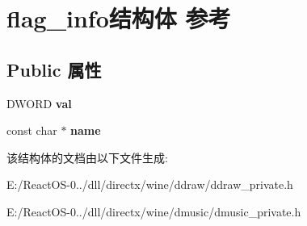 \hypertarget{structflag__info}{}\section{flag\+\_\+info结构体 参考}
\label{structflag__info}
\subsection*{Public 属性}
\begin{DoxyCompactItemize}
\item 
\mbox{\label{structflag__info_a89c65df7690934a6ab0f13f5fa7c6d4c}} 
D\+W\+O\+RD {\bfseries val}
\item 
\mbox{\label{structflag__info_afff9dcfdda258b284fbc5ae0bbb82bcc}} 
const char $\ast$ {\bfseries name}
\end{DoxyCompactItemize}


该结构体的文档由以下文件生成\+:\begin{DoxyCompactItemize}
\item 
E\+:/\+React\+O\+S-\/0../dll/directx/wine/ddraw/ddraw\+\_\+private.\+h\item 
E\+:/\+React\+O\+S-\/0../dll/directx/wine/dmusic/dmusic\+\_\+private.\+h\end{DoxyCompactItemize}
